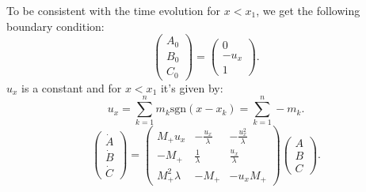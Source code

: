 \documentclass[english,master]{liumaiex}
\theoremstyle{plain}
\theoremstyle{definition}
\begin{document}
To be consistent with the time evolution for $x < x_1$, we get the following boundary condition:
\begin{equation}
\begin{pmatrix} A_0 \\ B_0 \\ C_0 \end{pmatrix} =
\begin{pmatrix} 0 \\ -u_x \\ 1 \end{pmatrix}.
\end{equation}
%
$u_x$ is a constant and for $x < x_1$ it's given by:
\begin{equation}
u_x = \sum_{k=1}^n m_k \text{sgn}(x - x_k) = \sum_{k=1}^n -m_k.
\end{equation}
%
\begin{equation}
\begin{pmatrix} \dot{A} \\ \dot{B} \\ \dot{C} \end{pmatrix} =
\begin{pmatrix}
	M_+ u_x & -\frac{u_x}{\lambda} & -\frac{u_x^2}{\lambda} \\
	-M_+ & \frac{1}{\lambda} & \frac{u_x}{\lambda} \\
	M_+^2 \lambda & -M_+ & -u_x M_+
\end{pmatrix}
\begin{pmatrix} A \\ B \\ C \end{pmatrix}.
\end{equation}

%
%




%
%


\end{document}
